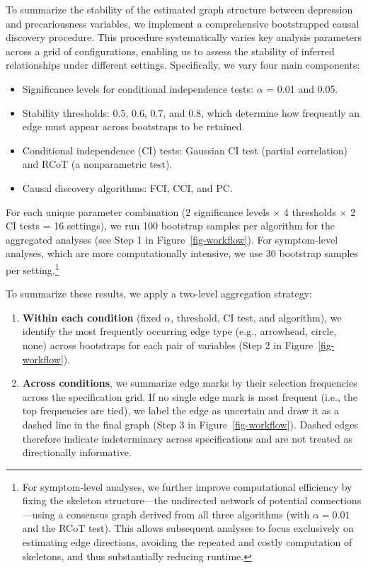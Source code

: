 \documentclass[
]{article}
\providecommand{\tightlist}{%
  \setlength{\itemsep}{0pt}\setlength{\parskip}{0pt}}\usepackage{longtable,booktabs,array}
\begin{document}
\textcolor{BrickRed}{To summarize the stability of the estimated graph structure between depression and precariousness variables, we implement a comprehensive bootstrapped causal discovery procedure.}
This procedure systematically varies key analysis parameters across a
grid of configurations, enabling us to assess the stability of inferred
relationships under different settings. Specifically, we vary four main
components:

\begin{itemize}
\tightlist
\item
  Significance levels for conditional independence tests: \(\alpha\) =
  0.01 and 0.05.
\item
  Stability thresholds: 0.5, 0.6, 0.7, and 0.8, which determine how
  frequently an edge must appear across bootstraps to be retained.
\item
  Conditional independence (CI) tests: Gaussian CI test (partial
  correlation) and RCoT (a nonparametric test).
\item
  Causal discovery algorithms: FCI, CCI, and PC.
\end{itemize}

For each unique parameter combination (2 significance levels × 4
thresholds × 2 CI tests = 16 settings), we run 100 bootstrap samples per
algorithm for the aggregated analyses (see Step 1 in
Figure~\ref{fig-workflow}). For symptom-level analyses, which are more
computationally intensive, we use 30 bootstrap samples per
setting.\footnote{For symptom-level analyses, we further improve
  computational efficiency by fixing the skeleton structure---the
  undirected network of potential connections---using a consensus graph
  derived from all three algorithms (with \(\alpha = 0.01\) and the RCoT
  test). This allows subsequent analyses to focus exclusively on
  estimating edge directions, avoiding the repeated and costly
  computation of skeletons, and thus substantially reducing runtime.}

To summarize these results, we apply a two-level aggregation strategy:

\begin{enumerate}
\def\labelenumi{\arabic{enumi}.}
\tightlist
\item
  \textbf{Within each condition} (fixed \(\alpha\), threshold, CI test,
  and algorithm), we identify the most frequently occurring edge type
  (e.g., arrowhead, circle, none) across bootstraps for each pair of
  variables (Step 2 in Figure~\ref{fig-workflow}).
\item
  \textbf{Across conditions},
  \textcolor{BrickRed}{we summarize edge marks by their selection frequencies across the specification grid. If no single edge mark is most frequent (i.e., the top frequencies are tied), we label the edge as uncertain and draw it as a dashed line in the final graph}
  (Step 3 in Figure~\ref{fig-workflow}).
  \textcolor{BrickRed}{Dashed edges therefore indicate indeterminacy across specifications and are not treated as directionally informative.}
\end{enumerate}
\end{document}
